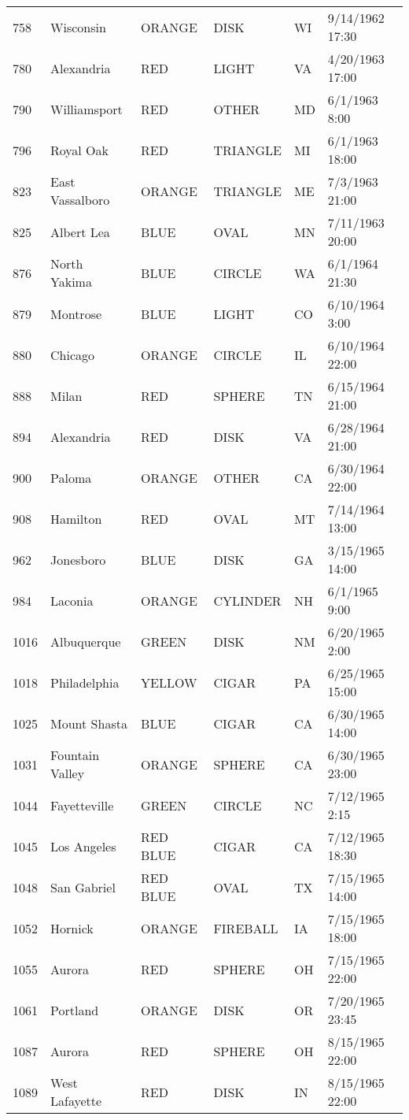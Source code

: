 \begin{tabular}{llllll}
758 & Wisconsin & ORANGE & DISK & WI & 9/14/1962 17:30 \\
780 & Alexandria & RED & LIGHT & VA & 4/20/1963 17:00 \\
790 & Williamsport & RED & OTHER & MD & 6/1/1963 8:00 \\
796 & Royal Oak & RED & TRIANGLE & MI & 6/1/1963 18:00 \\
823 & East Vassalboro & ORANGE & TRIANGLE & ME & 7/3/1963 21:00 \\
825 & Albert Lea & BLUE & OVAL & MN & 7/11/1963 20:00 \\
876 & North Yakima & BLUE & CIRCLE & WA & 6/1/1964 21:30 \\
879 & Montrose & BLUE & LIGHT & CO & 6/10/1964 3:00 \\
880 & Chicago & ORANGE & CIRCLE & IL & 6/10/1964 22:00 \\
888 & Milan & RED & SPHERE & TN & 6/15/1964 21:00 \\
894 & Alexandria & RED & DISK & VA & 6/28/1964 21:00 \\
900 & Paloma & ORANGE & OTHER & CA & 6/30/1964 22:00 \\
908 & Hamilton & RED & OVAL & MT & 7/14/1964 13:00 \\
962 & Jonesboro & BLUE & DISK & GA & 3/15/1965 14:00 \\
984 & Laconia & ORANGE & CYLINDER & NH & 6/1/1965 9:00 \\
1016 & Albuquerque & GREEN & DISK & NM & 6/20/1965 2:00 \\
1018 & Philadelphia & YELLOW & CIGAR & PA & 6/25/1965 15:00 \\
1025 & Mount Shasta & BLUE & CIGAR & CA & 6/30/1965 14:00 \\
1031 & Fountain Valley & ORANGE & SPHERE & CA & 6/30/1965 23:00 \\
1044 & Fayetteville & GREEN & CIRCLE & NC & 7/12/1965 2:15 \\
1045 & Los Angeles & RED BLUE & CIGAR & CA & 7/12/1965 18:30 \\
1048 & San Gabriel & RED BLUE & OVAL & TX & 7/15/1965 14:00 \\
1052 & Hornick & ORANGE & FIREBALL & IA & 7/15/1965 18:00 \\
1055 & Aurora & RED & SPHERE & OH & 7/15/1965 22:00 \\
1061 & Portland & ORANGE & DISK & OR & 7/20/1965 23:45 \\
1087 & Aurora & RED & SPHERE & OH & 8/15/1965 22:00 \\
1089 & West Lafayette & RED & DISK & IN & 8/15/1965 22:00 \\

\end{tabular}
